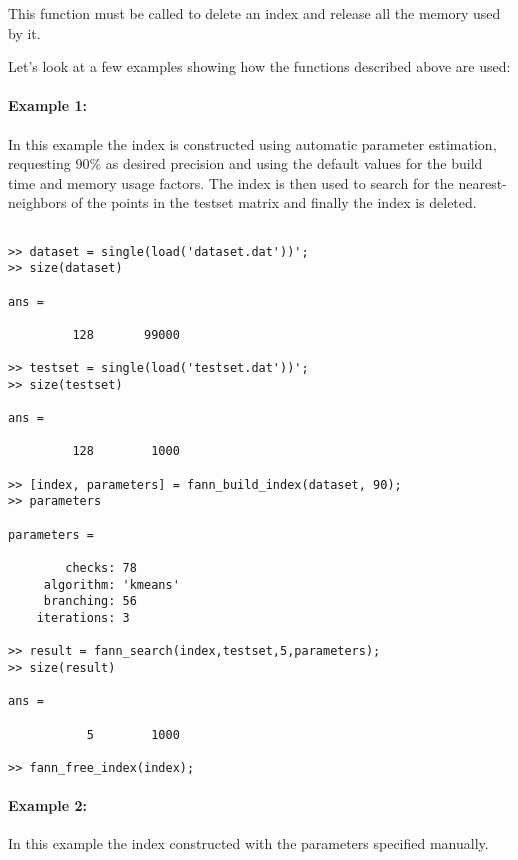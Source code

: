 \documentclass[letter,10pt]{article}
\begin{document}
This function must be called to delete an index and release all the memory used by it.

\bigskip

Let's look at a few examples showing how the functions described above are used:

\paragraph{Example 1:}

In this example the index is constructed using automatic parameter estimation, requesting 90\% as desired precision and using the default values for the build time and memory usage factors. The index is then used to search for the nearest-neighbors of the points in the testset matrix and finally the index is deleted.

\begin{Verbatim}[fontsize=\footnotesize,frame=single]

>> dataset = single(load('dataset.dat'))';
>> size(dataset)

ans =

         128       99000

>> testset = single(load('testset.dat'))';
>> size(testset)

ans =

         128        1000

>> [index, parameters] = fann_build_index(dataset, 90);
>> parameters

parameters = 

        checks: 78
     algorithm: 'kmeans'
     branching: 56
    iterations: 3

>> result = fann_search(index,testset,5,parameters);
>> size(result)

ans =

           5        1000

>> fann_free_index(index);

\end{Verbatim}




% 
% 


\paragraph{Example 2:}

In this example the index constructed with the parameters specified manually.
\end{document}
